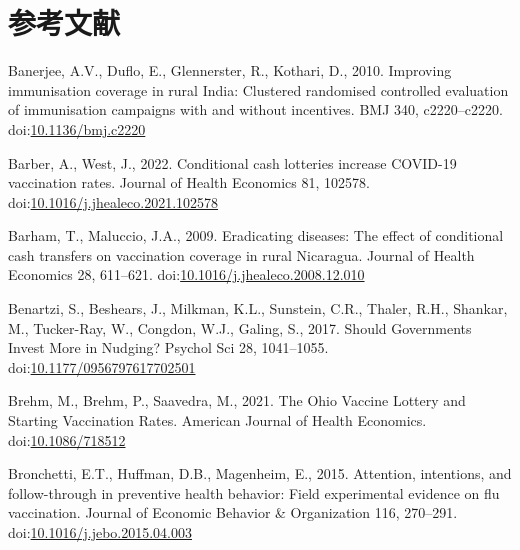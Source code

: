 \documentclass[
  11pt,
  a4paper,
]{article}
\newlength{\cslhangindent}
\newlength{\cslentryspacingunit} %
\newenvironment{CSLReferences}[2] %
 {%
  \setlength{\parindent}{0pt}
  \ifodd #1
  \let\oldpar\par
  \def\par{\hangindent=\cslhangindent\oldpar}
  \fi
  \setlength{\parskip}{#2\cslentryspacingunit}
 }%
 {}
\begin{document}
\newpage

\hypertarget{ux53c2ux8003ux6587ux732e}{%
\section*{参考文献}\label{ux53c2ux8003ux6587ux732e}}

\hypertarget{refs}{}
\begin{CSLReferences}{1}{0}
\leavevmode{}%
Banerjee, A.V., Duflo, E., Glennerster, R., Kothari, D., 2010. Improving immunisation coverage in rural {India}: Clustered randomised controlled evaluation of immunisation campaigns with and without incentives. BMJ 340, c2220--c2220. doi:\href{https://doi.org/10.1136/bmj.c2220}{10.1136/bmj.c2220}

\leavevmode{}%
Barber, A., West, J., 2022. Conditional cash lotteries increase {COVID-19} vaccination rates. Journal of Health Economics 81, 102578. doi:\href{https://doi.org/10.1016/j.jhealeco.2021.102578}{10.1016/j.jhealeco.2021.102578}

\leavevmode{}%
Barham, T., Maluccio, J.A., 2009. Eradicating diseases: {The} effect of conditional cash transfers on vaccination coverage in rural {Nicaragua}. Journal of Health Economics 28, 611--621. doi:\href{https://doi.org/10.1016/j.jhealeco.2008.12.010}{10.1016/j.jhealeco.2008.12.010}

\leavevmode{}%
Benartzi, S., Beshears, J., Milkman, K.L., Sunstein, C.R., Thaler, R.H., Shankar, M., Tucker-Ray, W., Congdon, W.J., Galing, S., 2017. Should {Governments Invest More} in {Nudging}? Psychol Sci 28, 1041--1055. doi:\href{https://doi.org/10.1177/0956797617702501}{10.1177/0956797617702501}

\leavevmode{}%
Brehm, M., Brehm, P., Saavedra, M., 2021. The {Ohio Vaccine Lottery} and {Starting Vaccination Rates}. American Journal of Health Economics. doi:\href{https://doi.org/10.1086/718512}{10.1086/718512}

\leavevmode{}%
Bronchetti, E.T., Huffman, D.B., Magenheim, E., 2015. Attention, intentions, and follow-through in preventive health behavior: {Field} experimental evidence on flu vaccination. Journal of Economic Behavior \& Organization 116, 270--291. doi:\href{https://doi.org/10.1016/j.jebo.2015.04.003}{10.1016/j.jebo.2015.04.003}


\end{CSLReferences}
\end{document}

